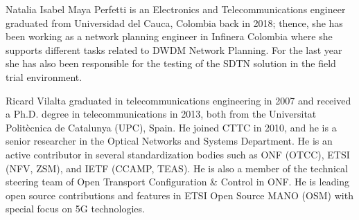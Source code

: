 \documentclass[10pt, conference]{IEEEtran}
\begin{document}
\begin{IEEEbiography}%
{Natalia Isabel Maya Perfetti} is an Electronics and Telecommunications engineer graduated from Universidad del Cauca, Colombia back in 2018; thence, she has been working as a network planning engineer in Infinera Colombia where she supports different tasks related to DWDM Network Planning. For the last year she has also been responsible for the testing of the SDTN solution in the field trial environment.\end{IEEEbiography}

\begin{IEEEbiography}%
{Ricard Vilalta} graduated in telecommunications engineering in 2007 and received a Ph.D. degree in telecommunications in 2013, both from the Universitat Politècnica de Catalunya (UPC), Spain. He joined CTTC in 2010, and he is a senior researcher in the Optical Networks and Systems Department. He is an active contributor in several standardization bodies such as ONF (OTCC), ETSI (NFV, ZSM), and IETF (CCAMP, TEAS). He is also a member of the technical steering team of Open Transport Configuration \& Control in ONF. He is leading open source contributions and features in ETSI Open Source MANO (OSM) with special focus on 5G technologies.\end{IEEEbiography}
\end{document}
